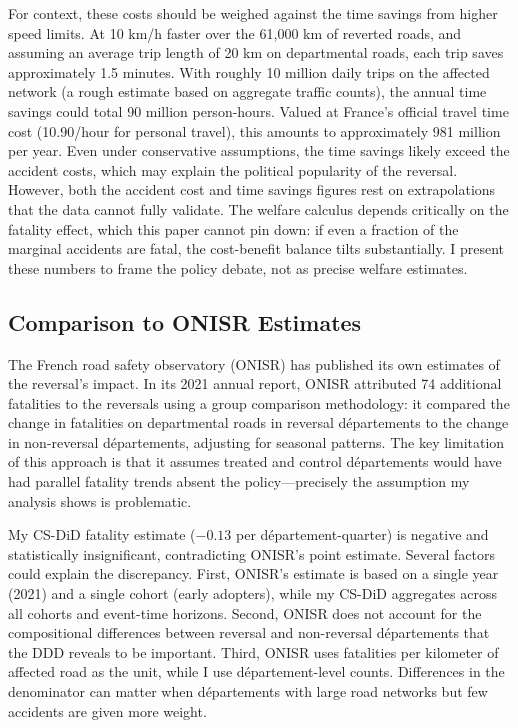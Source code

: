 \documentclass[12pt]{article}
\begin{document}
For context, these costs should be weighed against the time savings from higher speed limits. At 10 km/h faster over the 61,000 km of reverted roads, and assuming an average trip length of 20 km on departmental roads, each trip saves approximately 1.5 minutes. With roughly 10 million daily trips on the affected network (a rough estimate based on aggregate traffic counts), the annual time savings could total 90 million person-hours. Valued at France's official travel time cost (\texteuro{}10.90/hour for personal travel), this amounts to approximately \texteuro{}981 million per year. Even under conservative assumptions, the time savings likely exceed the accident costs, which may explain the political popularity of the reversal. However, both the accident cost and time savings figures rest on extrapolations that the data cannot fully validate. The welfare calculus depends critically on the fatality effect, which this paper cannot pin down: if even a fraction of the marginal accidents are fatal, the cost-benefit balance tilts substantially. I present these numbers to frame the policy debate, not as precise welfare estimates.

\subsection{Comparison to ONISR Estimates}

The French road safety observatory (ONISR) has published its own estimates of the reversal's impact. In its 2021 annual report, ONISR attributed 74 additional fatalities to the reversals using a group comparison methodology: it compared the change in fatalities on departmental roads in reversal d\'{e}partements to the change in non-reversal d\'{e}partements, adjusting for seasonal patterns. The key limitation of this approach is that it assumes treated and control d\'{e}partements would have had parallel fatality trends absent the policy---precisely the assumption my analysis shows is problematic.

My CS-DiD fatality estimate ($-0.13$ per d\'{e}partement-quarter) is negative and statistically insignificant, contradicting ONISR's point estimate. Several factors could explain the discrepancy. First, ONISR's estimate is based on a single year (2021) and a single cohort (early adopters), while my CS-DiD aggregates across all cohorts and event-time horizons. Second, ONISR does not account for the compositional differences between reversal and non-reversal d\'{e}partements that the DDD reveals to be important. Third, ONISR uses fatalities per kilometer of affected road as the unit, while I use d\'{e}partement-level counts. Differences in the denominator can matter when d\'{e}partements with large road networks but few accidents are given more weight.
\end{document}
